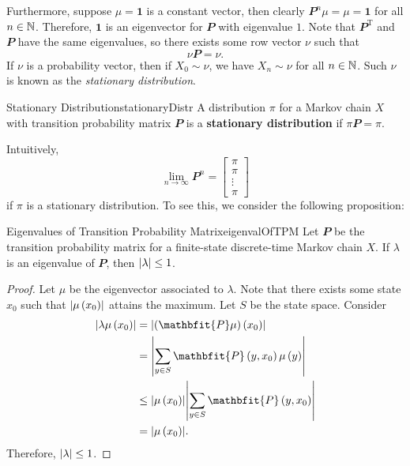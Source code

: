 \documentclass[math, code]{amznotes}
\theoremstyle{remark}
\begin{document}
Furthermore, suppose $\mu = \mathbf{1}$ is a constant vector, then clearly $\mathbfit{P}^n\mu = \mu = \mathbf{1}$ for all $n \in \mathbb{N}$. Therefore, $\mathbf{1}$ is an eigenvector for $\mathbfit{P}$ with eigenvalue $1$. Note that $\mathbfit{P}^{\mathrm{T}}$ and $\mathbfit{P}$ have the same eigenvalues, so there exists some row vector $\nu$ such that 
\begin{equation*}
    \nu\mathbfit{P} = \nu.
\end{equation*}
If $\nu$ is a probability vector, then if $X_0 \sim \nu$, we have $X_n \sim \nu$ for all $n \in \mathbb{N}$. Such $\nu$ is known as the \textit{stationary distribution}.
\begin{dfnbox}{Stationary Distribution}{stationaryDistr}
    A distribution $\pi$ for a Markov chain $X$ with transition probability matrix $\mathbfit{P}$ is a {\color{red} \textbf{stationary distribution}} if $\pi\mathbfit{P} = \pi$.
\end{dfnbox}
Intuitively, 
\begin{equation*}
    \lim_{n \to \infty}\mathbfit{P}^n = \begin{bmatrix}
        \pi \\
        \pi \\
        \vdots \\
        \pi
    \end{bmatrix}
\end{equation*}
if $\pi$ is a stationary distribution. To see this, we consider the following proposition:
\begin{probox}{Eigenvalues of Transition Probability Matrix}{eigenvalOfTPM}
    Let $\mathbfit{P}$ be the transition probability matrix for a finite-state discrete-time Markov chain $X$. If $\lambda$ is an eigenvalue of $\mathbfit{P}$, then ${\left\lvert {\lambda} \right\rvert} \leq 1$.
    \tcblower
    \begin{proof}
        Let $\mu$ be the eigenvector associated to $\lambda$. Note that there exists some state $x_0$ such that ${\left\lvert {\mu\left(x_0\right)} \right\rvert}$ attains the maximum. Let $S$ be the state space. Consider 
        \begin{align*}
            \abs{\lambda\mu\left(x_0\right)} & = \abs{\left(\mathbfit{P}\mu\right)\left(x_0\right)} \\
            & = \abs{\sum_{y \in S}\mathbfit{P}\left(y, x_0\right)\mu\left(y\right)} \\
            & \leq \abs{\mu\left(x_0\right)}\abs{\sum_{y \in S}\mathbfit{P}\left(y, x_0\right)} \\
            & = \abs{\mu\left(x_0\right)}.
        \end{align*}
        Therefore, ${\left\lvert {\lambda} \right\rvert} \leq 1$.
    \end{proof}
\end{probox}
\end{document}
